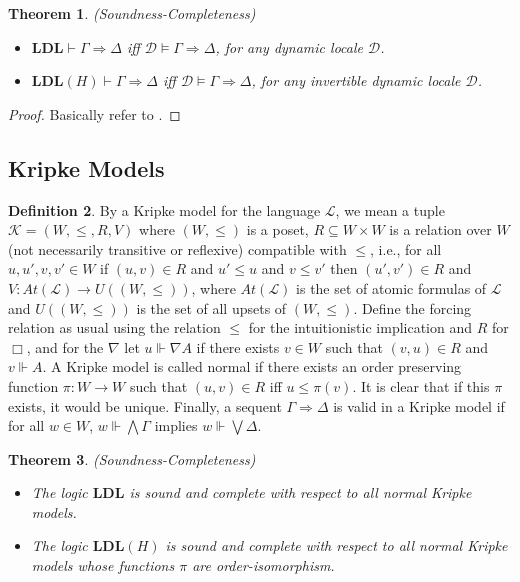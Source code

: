 \documentclass[12pt,a4paper]{article}
\theoremstyle{plain}
\newtheorem{thm}{Theorem}[section]
\theoremstyle{definition}
\newtheorem{dfn}[thm]{Definition}
\begin{document}
\begin{thm}\label{t4-2}(Soundness-Completeness)
\begin{itemize}
\item[$(i)$]
$ \mathbf{LDL} \vdash \Gamma \Rightarrow \Delta$ iff $\mathcal{D} \vDash \Gamma \Rightarrow \Delta$, for any dynamic locale $\mathcal{D}$.
\item[$(ii)$]
$ \mathbf{LDL}(H) \vdash \Gamma \Rightarrow \Delta$ iff $\mathcal{D} \vDash \Gamma \Rightarrow \Delta$,  for any invertible dynamic locale $\mathcal{D}$.
\end{itemize}

\end{thm}
\begin{proof}
Basically refer to \cite{Amir}.
\end{proof}

\subsection{Kripke Models} \label{KripkeModels}

\begin{dfn}
By a Kripke model for the language $\mathcal{L}$, we mean a tuple $\mathcal{K}=(W, \leq, R, V)$ where $(W, \leq)$ is a poset, $R \subseteq W \times W$ is a relation over $W$ (not necessarily transitive or reflexive) compatible with $\leq$, i.e., for all $u, u', v, v' \in W$ if $(u, v) \in R$ and $u' \leq u$ and $v \leq v'$ then $(u', v') \in R$ and $V: At(\mathcal{L}) \to U((W, \leq))$, where $At(\mathcal{L})$ is the set of atomic formulas of $\mathcal{L}$ and $U((W, \leq))$ is the set of all upsets of $(W, \leq)$. Define the forcing relation as usual using the relation $\leq$ for the intuitionistic implication and $R$ for $\Box$, and for the $\nabla$ let $u \Vdash \nabla A$ if there exists $v \in W$ such that $(v, u) \in R$ and $v \Vdash A$. A Kripke model is called normal if there exists an order preserving function $\pi : W \to W$ such that $(u, v) \in R$ iff $u \leq \pi(v)$. It is clear that if this $\pi$ exists, it would be unique. Finally, a sequent $\Gamma \Rightarrow \Delta$ is valid in a Kripke model if for all $w \in W$, $w \Vdash \bigwedge \Gamma$ implies $w \Vdash \bigvee \Delta$.
\end{dfn}

\begin{thm}(Soundness-Completeness)
\begin{itemize}
\item[$(i)$]
The logic $\mathbf{LDL}$ is sound and complete with respect to all normal Kripke models.
\item[$(ii)$]
The logic $\mathbf{LDL}(H)$ is sound and complete with respect to all normal Kripke models whose functions $\pi$ are order-isomorphism.
\end{itemize}
\end{thm}
\end{document}
